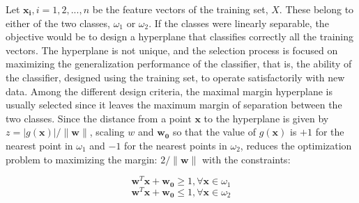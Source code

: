 Let $\mathbf{x_i}, i=1,2,...,n$ be the feature vectors of the training set, $X$. These belong to either of the two classes, $\omega_1$ or $\omega_2$. If the classes were linearly separable, the objective would be to design a hyperplane that classifies correctly all the training vectors. The hyperplane is not unique, and the selection process is focused on maximizing the generalization performance of the classifier, that is, the ability of the classifier, designed using the training set, to operate satisfactorily with new data. Among the different design criteria, the maximal margin hyperplane is usually selected since it leaves the maximum margin of separation between the two classes. Since the distance from a point $\mathbf{x}$ to the hyperplane is given by $z=|g(\mathbf{x})| / \|\mathbf{w}\|$, scaling $w$ and $\mathbf{w_0}$ so that the value of $g(\textbf{x})$ is $+1$ for the nearest point in $\omega_1$ and $-1$ for the nearest points in $\omega_2$, reduces the optimization problem to maximizing the margin: $2/\|\mathbf{w}\|$ with the constraints:

\begin{equation}
\mathbf{w}^T \mathbf{x} + \mathbf{w_0} \ge 1, \forall \mathbf{x} \in \omega_1
\end{equation}
\begin{equation}
\mathbf{w}^T \mathbf{x} + \mathbf{w_0} \le 1, \forall \mathbf{x} \in \omega_2
\end{equation}

